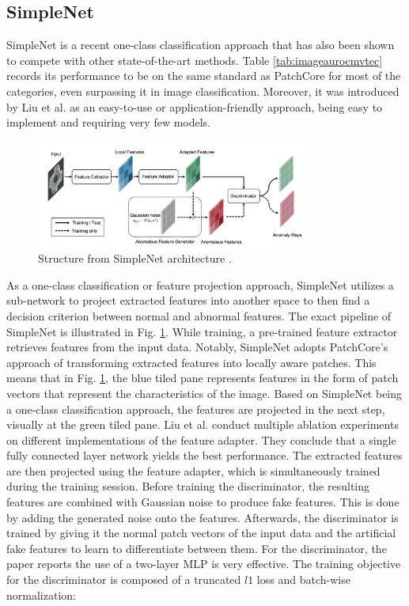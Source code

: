 \subsection{SimpleNet}
\label{subsec:simplenet}
SimpleNet \cite{liu2023simplenet} is a recent one-class classification approach that has also been shown to compete with other state-of-the-art methods. Table \ref{tab:imageaurocmvtec} records its performance to be on the same standard as PatchCore 
for most of the categories, even surpassing it in image classification. 
Moreover, it was introduced by Liu et al. as an easy-to-use or application-friendly approach, being easy to implement and requiring very few models.

\begin{figure}[H]
\centering
\includegraphics[width=0.8\textwidth]{figures/simplenet_architecture.png}
\caption{Structure from SimpleNet architecture \cite{liu2023simplenet}.}
\label{fig:simplenetpipeline}
\end{figure}

As a one-class classification or feature projection approach, SimpleNet utilizes a sub-network to project extracted features into another space to then find a decision criterion between normal and 
abnormal features. The exact pipeline of SimpleNet is illustrated in Fig. \ref{fig:simplenetpipeline}. While training, a pre-trained feature extractor retrieves features from the input data. Notably, SimpleNet adopts PatchCore's approach of transforming extracted features into locally aware patches. This means that in Fig. \ref{fig:simplenetpipeline}, the blue tiled pane represents features in the form of patch vectors 
that represent the characteristics of the image. Based on SimpleNet being a one-class classification approach, the features are projected in the next step, visually at the green tiled pane. 
Liu et al. \cite{liu2023simplenet} conduct multiple ablation experiments on different implementations of the feature adapter. They conclude that a single fully connected layer network yields the best 
performance. The extracted features are then projected using the feature adapter, which is simultaneously trained during the training session. Before training the discriminator, the resulting 
features are combined with Gaussian noise to produce fake features. This is done by adding the generated noise onto the features. Afterwards, the discriminator is trained by giving it 
the normal patch vectors of the input data and the artificial fake features to learn to differentiate between them. For the discriminator, the paper reports the use of a two-layer 
MLP is very effective. The training objective for the discriminator is composed of a truncated $l1$ loss and batch-wise normalization:

